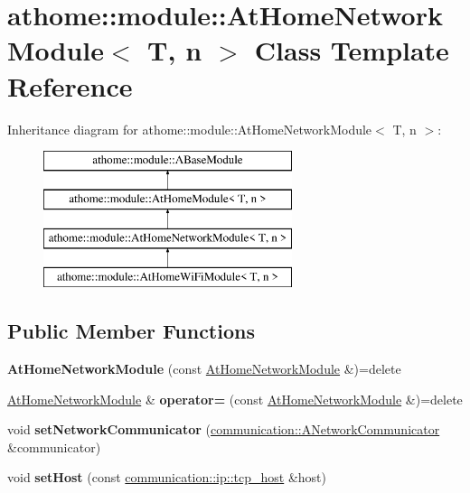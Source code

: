 \hypertarget{classathome_1_1module_1_1_at_home_network_module}{}\section{athome\+:\+:module\+:\+:At\+Home\+Network\+Module$<$ T, n $>$ Class Template Reference}
\label{classathome_1_1module_1_1_at_home_network_module}
Inheritance diagram for athome\+:\+:module\+:\+:At\+Home\+Network\+Module$<$ T, n $>$\+:\begin{figure}[H]
\begin{center}
\leavevmode
\includegraphics[height=4.000000cm]{classathome_1_1module_1_1_at_home_network_module}
\end{center}
\end{figure}
\subsection*{Public Member Functions}
\begin{DoxyCompactItemize}
\item 
\mbox{\label{classathome_1_1module_1_1_at_home_network_module_a1d2da6fec6ca0f45ba75d42a364f8954}} 
{\bfseries At\+Home\+Network\+Module} (const \mbox{\hyperlink{classathome_1_1module_1_1_at_home_network_module}{At\+Home\+Network\+Module}} \&)=delete
\item 
\mbox{\label{classathome_1_1module_1_1_at_home_network_module_abd5f316e792169fd36206b74e47b292d}} 
\mbox{\hyperlink{classathome_1_1module_1_1_at_home_network_module}{At\+Home\+Network\+Module}} \& {\bfseries operator=} (const \mbox{\hyperlink{classathome_1_1module_1_1_at_home_network_module}{At\+Home\+Network\+Module}} \&)=delete
\item 
\mbox{\label{classathome_1_1module_1_1_at_home_network_module_a34b6119931c22334085816f1060537ee}} 
void {\bfseries set\+Network\+Communicator} (\mbox{\hyperlink{classathome_1_1communication_1_1_a_network_communicator}{communication\+::\+A\+Network\+Communicator}} \&communicator)
\item 
\mbox{\label{classathome_1_1module_1_1_at_home_network_module_a52d8845deb42ed1fd8230068f7810ec2}} 
void {\bfseries set\+Host} (const \mbox{\hyperlink{structathome_1_1communication_1_1ip_1_1s__host}{communication\+::ip\+::tcp\+\_\+host}} \&host)
\end{DoxyCompactItemize}
